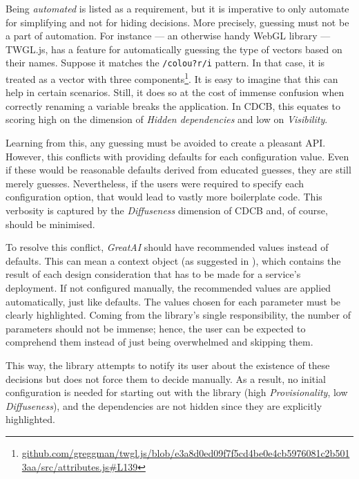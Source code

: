 Being \textit{automated} is listed as a requirement, but it is imperative to only automate for simplifying and not for hiding decisions. More precisely, guessing must not be a part of automation. For instance --- an otherwise handy WebGL library --- TWGL.js, has a feature for automatically guessing the type of vectors based on their names. Suppose it matches the \texttt{/colou?r/i} pattern. In that case, it is treated as a vector with three components\footnote{\href{https://github.com/greggman/twgl.js/blob/e3a8d0ed09f7f5cd4be0e4cb5976081c2b5013aa/src/attributes.js\#L139}{\tiny github.com/greggman/twgl.js/blob/e3a8d0ed09f7f5cd4be0e4cb5976081c2b5013aa/src/attributes.js\#L139}}. It is easy to imagine that this can help in certain scenarios. Still, it does so at the cost of immense confusion when correctly renaming a variable breaks the application. In CDCB, this equates to scoring high on the dimension of \textit{Hidden dependencies} and low on \textit{Visibility}.

Learning from this, any guessing must be avoided to create a pleasant API. However, this conflicts with providing defaults for each configuration value. Even if these would be reasonable defaults derived from educated guesses, they are still merely guesses. Nevertheless, if the users were required to specify each configuration option, that would lead to vastly more boilerplate code. This verbosity is captured by the \textit{Diffuseness} dimension of CDCB and, of course, should be minimised.

To resolve this conflict, \textit{GreatAI} should have recommended values instead of defaults. This can mean a context object (as suggested in \cite{ousterhout2018philosophy}), which contains the result of each design consideration that has to be made for a service's deployment. If not configured manually, the recommended values are applied automatically, just like defaults. The values chosen for each parameter must be clearly highlighted. Coming from the library's single responsibility, the number of parameters should not be immense; hence, the user can be expected to comprehend them instead of just being overwhelmed and skipping them.

This way, the library attempts to notify its user about the existence of these decisions but does not force them to decide manually. As a result, no initial configuration is needed for starting out with the library (high \textit{Provisionality}, low \textit{Diffuseness}), and the dependencies are not hidden since they are explicitly highlighted.

